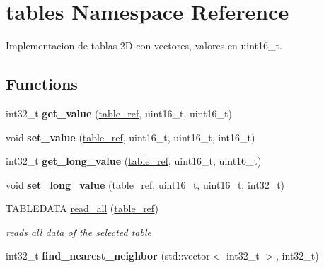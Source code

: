 \hypertarget{namespacetables}{}\section{tables Namespace Reference}
\label{namespacetables}


Implementacion de tablas 2D con vectores, valores en uint16\+\_\+t.  


\subsection*{Functions}
\begin{DoxyCompactItemize}
\item 
\mbox{\label{namespacetables_aa361755be4088de3da009b278451f74b}} 
int32\+\_\+t {\bfseries get\+\_\+value} (\hyperlink{structtable__ref}{table\+\_\+ref}, uint16\+\_\+t, uint16\+\_\+t)
\item 
\mbox{\label{namespacetables_afdeac8e88a25e9a65a4afd6a6f881f20}} 
void {\bfseries set\+\_\+value} (\hyperlink{structtable__ref}{table\+\_\+ref}, uint16\+\_\+t, uint16\+\_\+t, int16\+\_\+t)
\item 
\mbox{\label{namespacetables_a8bb312dd55d1189bd4ceb6847087f9f5}} 
int32\+\_\+t {\bfseries get\+\_\+long\+\_\+value} (\hyperlink{structtable__ref}{table\+\_\+ref}, uint16\+\_\+t, uint16\+\_\+t)
\item 
\mbox{\label{namespacetables_a55cb401646e4582c598f0ed53f4bcfd7}} 
void {\bfseries set\+\_\+long\+\_\+value} (\hyperlink{structtable__ref}{table\+\_\+ref}, uint16\+\_\+t, uint16\+\_\+t, int32\+\_\+t)
\item 
T\+A\+B\+L\+E\+D\+A\+TA \hyperlink{namespacetables_a8a1bab94b65aabe4f2b226cdac58b41f}{read\+\_\+all} (\hyperlink{structtable__ref}{table\+\_\+ref})
\begin{DoxyCompactList}\small\item\em reads all data of the selected table \end{DoxyCompactList}\item 
\mbox{\label{namespacetables_a56f811fc2ad9ddcc8580af63abb9c200}} 
int32\+\_\+t {\bfseries find\+\_\+nearest\+\_\+neighbor} (std\+::vector$<$ int32\+\_\+t $>$, int32\+\_\+t)
\item 

\end{DoxyCompactItemize}
